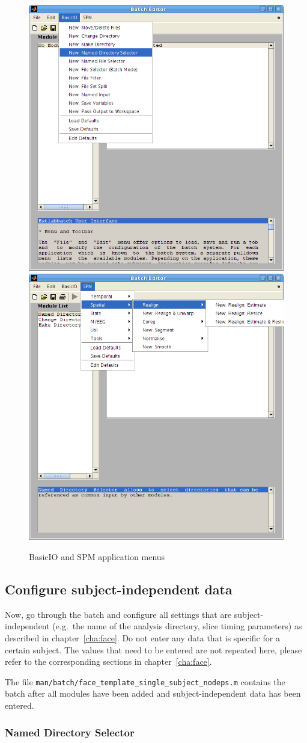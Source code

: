 \documentclass[a4paper]{book}
\begin{document}
\begin{figure}
  \centering
  \includegraphics[width=.49\linewidth]{batch_basicio}
  \hfill
  \includegraphics[width=.49\linewidth]{batch_spm}      
  \caption{BasicIO and SPM application menus}
  \label{fig:basicio_spm}
\end{figure}

\subsection{Configure subject-independent data}

Now, go through the batch and configure all settings that are
subject-independent (e.g.\ the name of the analysis directory, slice timing
parameters) as described in chapter~\ref{cha:face}. Do not enter any data that
is specific for a certain subject. The values that need to be entered are not
repeated here, please refer to the corresponding sections in
chapter~\ref{cha:face}.

The file \verb|man/batch/face_template_single_subject_nodeps.m| contains the
batch after all modules have been added and subject-independent data has been
entered.

\subsubsection*{Named Directory Selector}
\end{document}
